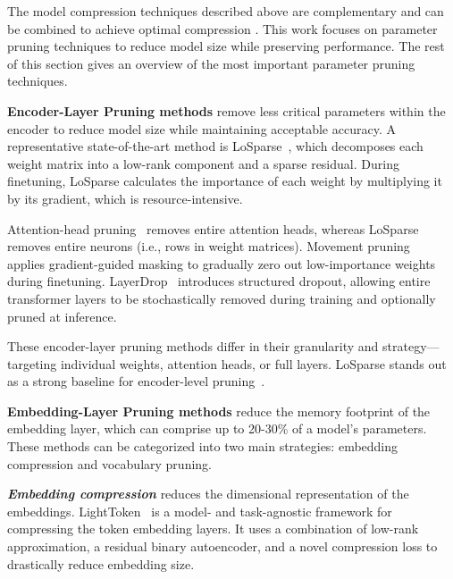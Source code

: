 \documentclass[twocolumn]{article}
\begin{document}
The model compression techniques described above are complementary and can be combined to achieve optimal compression \cite{muralidharan2024compact, han2015deep, choukroun2019low}.
This work focuses on parameter pruning techniques to reduce model size while preserving performance. The rest of this section gives an overview of the most important parameter pruning techniques.


\textbf{Encoder-Layer Pruning methods} remove less critical parameters within the encoder to reduce model size while maintaining acceptable accuracy. A representative state-of-the-art method is LoSparse~\cite{li2023losparse}, which decomposes each weight matrix into a low-rank component and a sparse residual. During finetuning, LoSparse calculates the importance of each weight by multiplying it by its gradient, which is resource-intensive.

Attention-head pruning~\cite{michel2019sixteen} removes entire attention heads, whereas LoSparse removes entire neurons (i.e., rows in weight matrices). Movement pruning~\cite{sanh2020movement} applies gradient-guided masking to gradually zero out low-importance weights during finetuning. LayerDrop~\cite{fan2020layerdrop} introduces structured dropout, allowing entire transformer layers to be stochastically removed during training and optionally pruned at inference.

These encoder-layer pruning methods differ in their granularity and strategy—targeting individual weights, attention heads, or full layers. LoSparse stands out as a strong baseline for encoder-level pruning~\cite{pmlr-v235-li24bi, huang2023awesome, ren2025llmcompression}.


\textbf{Embedding-Layer Pruning methods} reduce the memory footprint of the embedding layer, which can comprise up to 20-30\% of a model's parameters. These methods can be categorized into two main strategies: embedding compression and vocabulary pruning.

\textit{\textbf{Embedding compression}} reduces the dimensional representation of the embeddings. LightToken~\cite{wang2023lighttoken} is a model- and task-agnostic framework for compressing the token embedding layers. It uses a combination of low-rank approximation, a residual binary autoencoder, and a novel compression loss to drastically reduce embedding size. 
\end{document}
